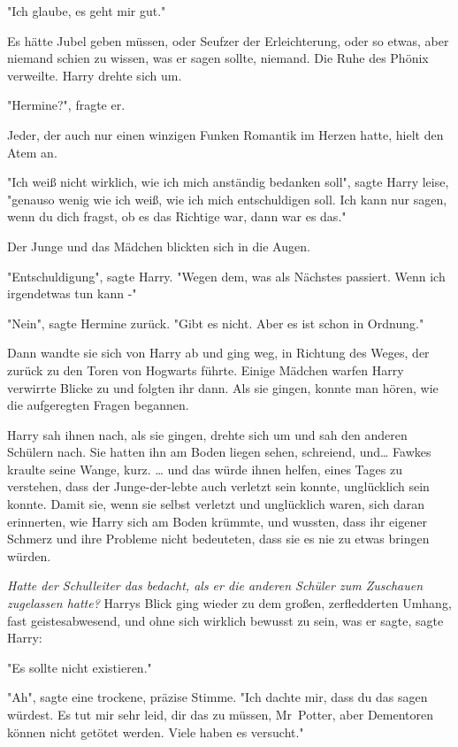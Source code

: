{"Ich glaube, es geht mir gut."

Es hätte Jubel geben müssen, oder Seufzer der Erleichterung, oder so etwas, aber niemand schien zu wissen, was er sagen sollte, niemand. Die Ruhe des Phönix verweilte. Harry drehte sich um.

"Hermine?", fragte er.

Jeder, der auch nur einen winzigen Funken Romantik im Herzen hatte, hielt den Atem an.

"Ich weiß nicht wirklich, wie ich mich anständig bedanken soll", sagte Harry leise, "genauso wenig wie ich weiß, wie ich mich entschuldigen soll. Ich kann nur sagen, wenn du dich fragst, ob es das Richtige war, dann war es das."

Der Junge und das Mädchen blickten sich in die Augen.

"Entschuldigung", sagte Harry. "Wegen dem, was als Nächstes passiert. Wenn ich irgendetwas tun kann -"

"Nein", sagte Hermine zurück. "Gibt es nicht. Aber es ist schon in Ordnung."

Dann wandte sie sich von Harry ab und ging weg, in Richtung des Weges, der zurück zu den Toren von Hogwarts führte. Einige Mädchen warfen Harry verwirrte Blicke zu und folgten ihr dann. Als sie gingen, konnte man hören, wie die aufgeregten Fragen begannen.

Harry sah ihnen nach, als sie gingen, drehte sich um und sah den anderen Schülern nach. Sie hatten ihn am Boden liegen sehen, schreiend, und… Fawkes kraulte seine Wange, kurz. … und das würde ihnen helfen, eines Tages zu verstehen, dass der Junge-der-lebte auch verletzt sein konnte, unglücklich sein konnte. Damit sie, wenn sie selbst verletzt und unglücklich waren, sich daran erinnerten, wie Harry sich am Boden krümmte, und wussten, dass ihr eigener Schmerz und ihre Probleme nicht bedeuteten, dass sie es nie zu etwas bringen würden.

\emph{\hfill\break Hatte der Schulleiter das bedacht, als er die anderen Schüler zum Zuschauen zugelassen hatte?} Harrys Blick ging wieder zu dem großen, zerfledderten Umhang, fast geistesabwesend, und ohne sich wirklich bewusst zu sein, was er sagte, sagte Harry:

"Es sollte nicht existieren."

"Ah", sagte eine trockene, präzise Stimme. "Ich dachte mir, dass du das sagen würdest. Es tut mir sehr leid, dir das zu müssen, Mr~Potter, aber Dementoren können nicht getötet werden. Viele haben es versucht."

}
